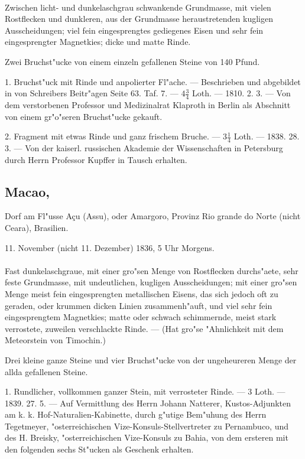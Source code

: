 \documentclass[a4paper, 11pt, oneside, polutonikogreek, german]{article}
\begin{document}
\paragraph{}
Zwischen licht- und dunkelaschgrau schwankende Grundmasse, mit vielen Rostflecken und dunkleren, aus der Grundmasse heraustretenden kugligen Ausscheidungen; viel fein eingesprengtes gediegenes Eisen und sehr fein eingesprengter Magnetkies; dicke und matte Rinde.

Zwei Bruchst"ucke von einem einzeln gefallenen Steine von 140 Pfund.

1. Bruchst"uck mit Rinde und anpolierter Fl"ache. --- Beschrieben und abgebildet in von Schreibers Beitr"agen Seite 63. Taf. 7. --- $4\frac{3}{4}$ Loth. --- 1810. 2. 3. --- Von dem verstorbenen Professor und Medizinalrat Klaproth in Berlin als Abschnitt von einem gr"o"seren Bruchst"ucke gekauft.

2. Fragment mit etwas Rinde und ganz frischem Bruche. --- $3\frac{1}{4}$ Loth. --- 1838. 28. 3. --- Von der kaiserl. russischen Akademie der Wissenschaften in Petersburg durch Herrn Professor Kupffer in Tausch erhalten.
\subsection[Macao.]{Macao,}
\begin{center}
\small
Dorf am Fl"usse Açu (Assu), oder Amargoro, Provinz Rio grande do Norte (nicht Ceara), Brasilien.

11. November (nicht 11. Dezember) 1836, 5 Uhr Morgens.
\end{center}
\paragraph{}
Fast dunkelaschgraue, mit einer gro"sen Menge von Rostflecken durchs"aete, sehr feste Grundmasse, mit undeutlichen, kugligen Ausscheidungen; mit einer gro"sen Menge meist fein eingesprengten metallischen Eisens, das sich jedoch oft zu geraden, oder krummen dicken Linien zusammenh"auft, und viel sehr fein eingesprengtem Magnetkies; matte oder schwach schimmernde, meist stark verrostete, zuweilen verschlackte Rinde. --- (Hat gro"se "Ahnlichkeit mit dem Meteorstein von Timochin.)

Drei kleine ganze Steine und vier Bruchst"ucke von der ungeheureren Menge der allda gefallenen Steine.

1. Rundlicher, vollkommen ganzer Stein, mit verrosteter Rinde. --- 3 Loth. --- 1839. 27. 5. --- Auf Vermittlung des Herrn Johann Natterer, Kustos-Adjunkten am k. k. Hof-Naturalien-Kabinette, durch g"utige Bem"uhung des Herrn Tegetmeyer, "osterreichischen Vize-Konsuls-Stellvertreter zu Pernambuco, und des H. Breisky, "osterreichischen Vize-Konsuls zu Bahia, von dem ersteren mit den folgenden sechs St"ucken als Geschenk erhalten.
\end{document}
